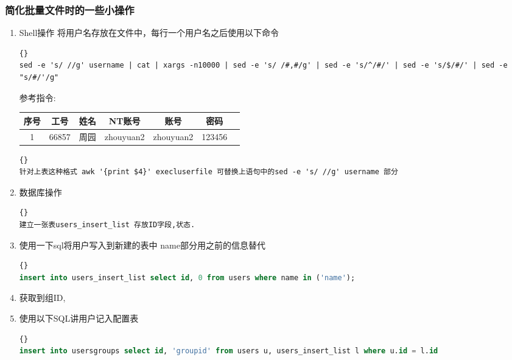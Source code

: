 \documentclass[11pt,a4paper]{article}
\begin{document}
	\subsubsection {简化批量文件时的一些小操作}
		\begin{enumerate}[step 1]
		\item Shell操作
将用户名存放在文件中，每行一个用户名之后使用以下命令
		\begin{lstlisting}[language={[ANSI]C}]{}
sed -e 's/ //g' username | cat | xargs -n10000 | sed -e 's/ /#,#/g' | sed -e 's/^/#/' | sed -e 's/$/#/' | sed -e "s/#/'/g"
		\end{lstlisting}
		参考指令:  
		\begin{table}[!htp]
		\begin{center}
		\begin{tabular}{|c|c|c|c|c|clc|}
		\hline
序号 & 工号 & 姓名 & NT账号 & 账号 & 
		\multicolumn{2}{|c|}{密码}  \\
		\hline
1  & 66857 & 周园 & zhouyuan2 & zhouyuan2  & 
		\multicolumn{2}{|c|}{123456}  \\
		\hline
		\end{tabular}
		\end{center}
		\end{table}
		
		\begin{lstlisting}[language={[ANSI]C}]{}
针对上表这种格式 awk '{print $4}' execluserfile 可替换上语句中的sed -e 's/ //g' username 部分
		\end{lstlisting}
		\item 数据库操作
		\begin{lstlisting}[language={[ANSI]C}]{}
建立一张表users_insert_list 存放ID字段,状态.
		\end{lstlisting}
		\item 使用一下sql将用户写入到新建的表中 name部分用之前的信息替代
		\begin{lstlisting}[language={SQL}]{}
insert into users_insert_list select id, 0 from users where name in ('name'); 
		\end{lstlisting}
		\item 获取到组ID, 
		\item 使用以下SQL讲用户记入配置表
		\begin{lstlisting}[language={SQL}]{}
insert into usersgroups select id, 'groupid' from users u, users_insert_list l where u.id = l.id 
		\end{lstlisting}
		\end{enumerate}
\end{document}
